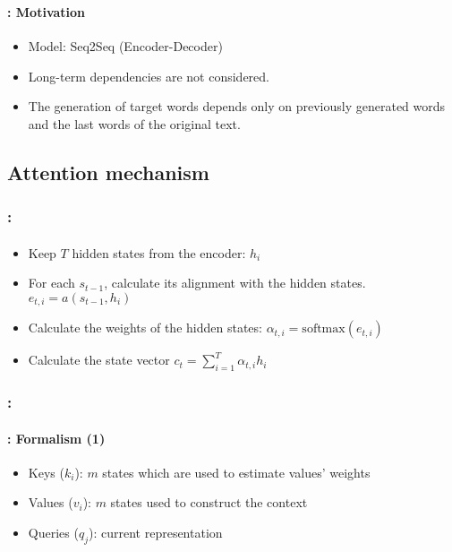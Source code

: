 \documentclass[xcolor=table]{beamer}
\begin{document}
\begin{frame}
	\frametitle{\insertshortsubtitle}
	\framesubtitle{\insertsection: Motivation}
	
	\begin{center}
	\end{center}

	\begin{itemize}
		\item Model: Seq2Seq (Encoder-Decoder)
		\item Long-term dependencies are not considered.
		\item The generation of target words depends only on previously generated words and the last words of the original text.
	\end{itemize}
	
\end{frame}

\subsection{Attention mechanism}

\begin{frame}
	\frametitle{\insertshortsubtitle: \insertsection}
	\framesubtitle{\insertsubsection}
	
	\begin{center}
	\end{center}
	
	\vskip-6pt
	\begin{itemize}
		\item Keep $T$ hidden states from the encoder: $h_i$
		\item For each $s_{t-1}$, calculate its alignment with the hidden states.
		$ e_{t, i} = a(s_{t-1}, h_i) $
		\item Calculate the weights of the hidden states: $\alpha_{t, i} = \text{softmax}(e_{t, i})$
		\item Calculate the state vector $c_t = \sum_{i=1}^{T} \alpha_{t, i} h_i$
	\end{itemize}
	
\end{frame}

\begin{frame}
	\frametitle{\insertshortsubtitle: \insertsection}
	\framesubtitle{\insertsubsection: Formalism (1)}
	
	\begin{center}
	\end{center}
	
	\vskip-6pt
	\begin{itemize}
		\item Keys ($k_i$): $m$ states which are used to estimate values' weights
		\item Values ($v_i$): $m$ states used to construct the context 
		\item Queries ($q_j$): current representation 
	\end{itemize}
	
\end{frame}
\end{document}
